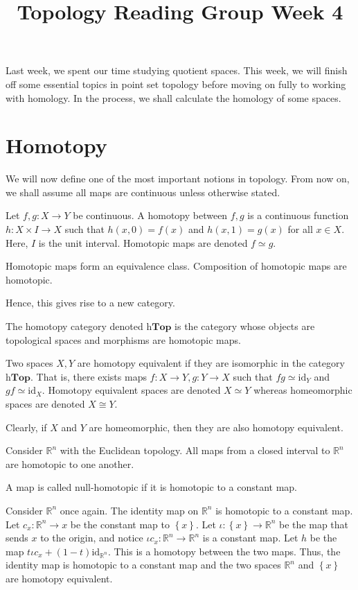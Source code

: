 \documentclass[12pt,reqno]{amsart}
\numberwithin{theorem}{section}
\theoremstyle{definition}
\theoremstyle{remark}
\numberwithin{equation}{section}
\newcommand{\set}[1]{\left \{ #1 \right \}}
\theoremstyle{definition}
\newcommand{\R}{\mathbb{R}}
\newcommand{\id}{\mathrm{id}}
\begin{document}
\title{Topology Reading Group Week 4}
\maketitle
Last week, we spent our time studying quotient spaces. This week, we will finish off some essential topics in point set topology before moving on fully to working with homology. In the process, we shall calculate the homology of some spaces.
\section{Homotopy}
We will now define one of the most important notions in topology. From now on, we shall assume all maps are continuous unless otherwise stated.
\begin{definition}
Let $f,g:X\rightarrow Y$ be continuous. A homotopy between $f,g$ is a continuous function $h:X\times I\rightarrow X$ such that $h(x,0)=f(x)$ and $h(x,1)=g(x)$ for all $x \in X$. Here, $I$ is the unit interval. Homotopic maps are denoted $f\simeq g$.
\end{definition}
\begin{proposition}
    Homotopic maps form an equivalence class. Composition of homotopic maps are homotopic.
\end{proposition}
Hence, this gives rise to a new category.
\begin{definition}
    The homotopy category denoted $\mathrm{h}\mathbf{Top}$ is the category whose objects are topological spaces and morphisms are homotopic maps.
\end{definition}
\begin{definition}
    Two spaces $X,Y$ are homotopy equivalent if they are isomorphic in the category $\mathrm{h}\mathbf{Top}$. That is, there exists maps $f:X\rightarrow Y,g:Y \rightarrow X$ such that $fg \simeq \id_Y$ and $gf \simeq \id_X$. Homotopy equivalent spaces are denoted $X\simeq Y$ whereas homeomorphic spaces are denoted $X\cong Y$.
\end{definition}
Clearly, if $X$ and $Y$ are homeomorphic, then they are also homotopy equivalent.
\begin{example}
    Consider $\R^n$ with the Euclidean topology. All maps from a closed interval to $\R^n$ are homotopic to one another.
\end{example}
\begin{definition}
    A map is called null-homotopic if it is homotopic to a constant map.
\end{definition}
\begin{example}
    Consider $\R^n$ once again. The identity map on $\R^n$ is homotopic to a constant map. Let $c_x: \R^n \rightarrow x$ be the constant map to $\set x$. Let $\iota : \set{x}\rightarrow \R^n$ be the map that sends $x$ to the origin, and notice $\iota c_x : \R^n \rightarrow \R^n$ is a constant map. Let $h$ be the map $t\iota c_x+(1-t)\id_{\R^n}$. This is a homotopy between the two maps. Thus, the identity map is homotopic to a constant map and the two spaces $\R^n$ and $\set x$ are homotopy equivalent.
\end{example}
\end{document}

